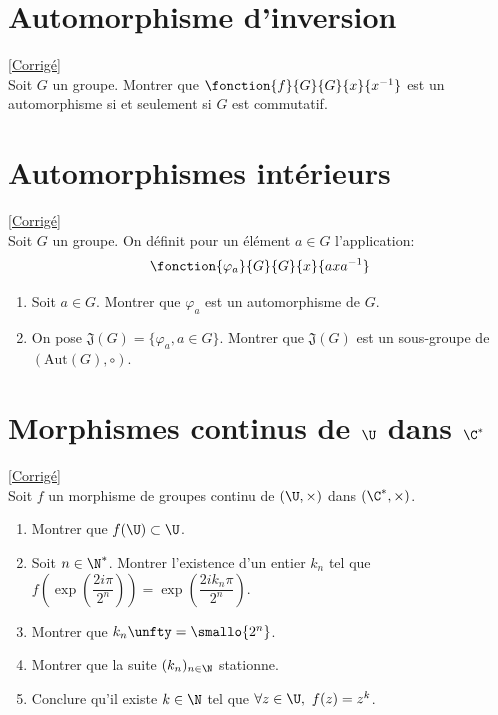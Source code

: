 \documentclass[8pt]{book}
\begin{document}
	
	\section{Automorphisme d'inversion }
	\label{Automorphisme d'inversion}
	\textcolor{blue}{\hyperref[Automorphisme d'inversion corrigé]{[Corrigé]}}\\
	Soit $G$ un groupe. Montrer que $\fonction{f}{G}{G}{x}{x^{-1}}$ est un automorphisme si et seulement si $G$ est commutatif.
	
	\section{Automorphismes intérieurs }
	\label{Automorphismes intérieurs}
	\textcolor{blue}{\hyperref[Automorphismes intérieurs corrigé]{[Corrigé]}}\\
	Soit $G$ un groupe. On définit pour un élément $a\in G$ l'application:
	$$\fonction{\varphi_a}{G}{G}{x}{axa^{-1}}$$
	\begin{enumerate}
		\item Soit $a\in G$. Montrer que $\varphi_a$ est un automorphisme de $G$.
		\item On pose $\mathfrak{J}(G)=\{\varphi_a,a\in G\}$. Montrer que $\mathfrak{J}(G)$ est un sous-groupe de $(\text{Aut}(G),\circ)$.\\
	\end{enumerate}
	
	\section{Morphismes continus de $\U$ dans $\C^*$ }
	\label{Morphismes continus de U dans C*}
	\textcolor{blue}{\hyperref[Morphismes continus de U dans C* corrigé]{[Corrigé]}}\\
	Soit $f$ un morphisme de groupes continu de $(\U,\times)$ dans $(\C^*,\times)$.
	\begin{enumerate}
		\item Montrer que $f(\U)\subset \U$.
		\item Soit $n\in \N^*$. Montrer l'existence d'un entier $k_n$ tel que $f\left(\exp\left(\dfrac{2i\pi}{2^n}\right)\right)=\exp\left(\dfrac{2ik_n\pi}{2^n}\right)$.
		\item Montrer que $k_n\unfty=\smallo{2^n}$.
		\item Montrer que la suite $(k_n)_{n\in \N}$ stationne.
		\item Conclure qu'il existe $k\in \N$ tel que $\forall z\in \U,\ f(z)=z^k$.
	\end{enumerate}
	
\end{document}

